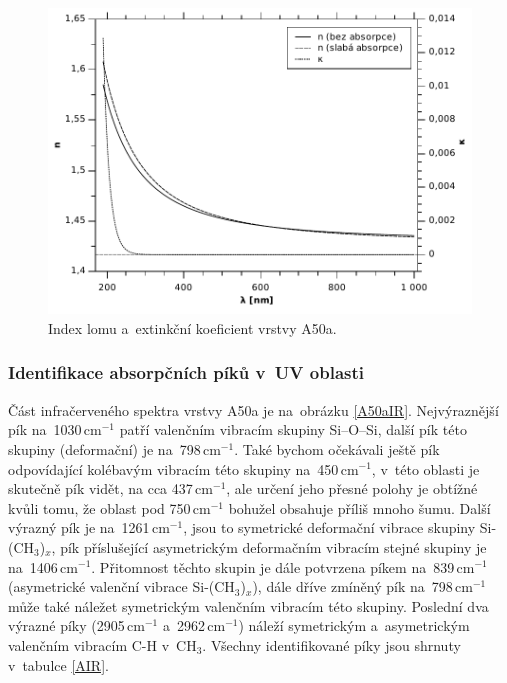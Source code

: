 \documentclass[12pt]{article}
\begin{document}
\begin{figure}
  \centering
  \includegraphics[width=135mm]{img/A50a-nk.pdf}
  \caption{Index lomu a~extinkční koeficient vrstvy A50a.}
  \label{A50ank}
\end{figure}

\subsubsection{Identifikace absorpčních píků v~UV oblasti }
Část infračerveného spektra vrstvy A50a je na~obrázku \ref{A50aIR}. Nejvýraznější pík na~1030\,cm$^{-1}$ patří valenčním vibracím skupiny Si--O--Si, další pík této skupiny (deformační) je na~798\,cm$^{-1}$. Také bychom očekávali ještě pík odpovídající kolébavým vibracím této skupiny na~450\,cm$^{-1}$, v~této oblasti je skutečně pík vidět, na cca 437\,cm$^{-1}$, ale určení jeho přesné polohy je obtížné kvůli tomu, že oblast pod 750\,cm$^{-1}$ bohužel obsahuje příliš mnoho šumu. Další výrazný pík je na~1261\,cm$^{-1}$, jsou to symetrické deformační vibrace skupiny Si-(CH$_3$)$_x$, pík příslušející asymetrickým deformačním vibracím stejné skupiny je na~1406\,cm$^{-1}$. Přitomnost těchto skupin je dále potvrzena píkem na~839\,cm$^{-1}$ (asymetrické valenční vibrace Si-(CH$_3$)$_x$), dále dříve zmíněný pík na~798\,cm$^{-1}$ může také náležet symetrickým valenčním vibracím této skupiny. Poslední dva výrazné píky (2905\,cm$^{-1}$ a~2962\,cm$^{-1}$) náleží symetrickým a~asymetrickým valenčním vibracím C-H v~CH$_3$. Všechny identifikované píky jsou shrnuty v~tabulce \ref{AIR}.
\end{document}
